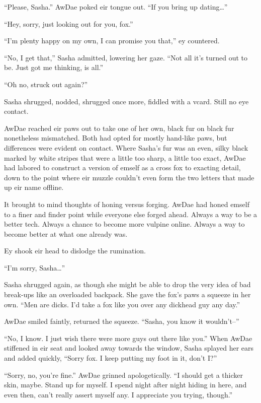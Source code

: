 ``Please, Sasha.'' AwDae poked eir tongue out. ``If you bring up dating\ldots{}''

``Hey, sorry, just looking out for you, fox.''

``I'm plenty happy on my own, I can promise you that,'' ey countered.

``No, I get that,'' Sasha admitted, lowering her gaze. ``Not all it's turned out to be. Just got me thinking, is all.''

``Oh no, struck out again?''

Sasha shrugged, nodded, shrugged once more, fiddled with a vcard. Still no eye contact.

AwDae reached eir paws out to take one of her own, black fur on black fur nonetheless mismatched. Both had opted for mostly hand-like paws, but differences were evident on contact. Where Sasha's fur was an even, silky black marked by white stripes that were a little too sharp, a little too exact, AwDae had labored to construct a version of emself as a cross fox to exacting detail, down to the point where eir muzzle couldn't even form the two letters that made up eir name offline.

It brought to mind thoughts of honing versus forging. AwDae had honed emself to a finer and finder point while everyone else forged ahead. Always a way to be a better tech. Always a chance to become more vulpine online. Always a way to become better at what one already was.

Ey shook eir head to dislodge the rumination.

``I'm sorry, Sasha\ldots{}''

Sasha shrugged again, as though she might be able to drop the very idea of bad break-ups like an overloaded backpack. She gave the fox's paws a squeeze in her own. ``Men are dicks. I'd take a fox like you over any dickhead guy any day.''

AwDae smiled faintly, returned the squeeze. ``Sasha, you know it wouldn't--''

``No, I know. I just wish there were more guys out there like you.'' When AwDae stiffened in eir seat and looked away towards the window, Sasha splayed her ears and added quickly, ``Sorry fox. I keep putting my foot in it, don't I?''

``Sorry, no, you're fine.'' AwDae grinned apologetically. ``I should get a thicker skin, maybe. Stand up for myself. I spend night after night hiding in here, and even then, can't really assert myself any. I appreciate you trying, though.''

